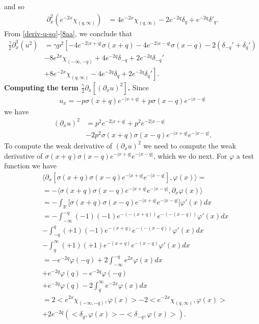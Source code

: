 \documentclass[12pt,reqno]{amsart}
\numberwithin{equation}{section}  %
\numberwithin{figure}{section}
\newcommand{\rr}{\mathbb{R}}
\newcommand{\p}{\partial}
\theoremstyle{plain}  %
\theoremstyle{definition}
\begin{document}
%
%
and so
%
%
\begin{equation}
  \label{6aa}
  \begin{split}
    \p_x^2 (e^{-2x} \chi_{(q, \infty)})
    & = 4e^{-2x} \chi_{(q, \infty)} - 2e^{-2q} \delta_{q} + e^{-2q}
    \delta'_{q}.
  \end{split}
\end{equation}
%
%
%
%
From \eqref{deriv-u-sq}-\eqref{8aa}, we conclude that
%
%
\begin{equation}
  \label{deriv-trip-u-sq}
  \begin{split}
    \frac{\gamma}{2}\p_x^3 (u^{2})
    & = \gamma p^{2}\left[ -4 e^{-2| x+q |} \sigma(x+q) - 4e^{-2| x-q
    |}\sigma(x-q) -2 (\delta_{-q}' + \delta_{q}') \right.
    \\
    & - 8e^{2x} \chi_{(-\infty, -q)} + 4e^{-2q} \delta_{-q} +
    2e^{-2q} \delta_{-q}'
    \\
    & \left. + 8e^{-2x}\chi_{(q, \infty)} -4 e^{-2q}
    \delta_{q} + 2e^{-2q} \delta_{q}' \right].
  \end{split}
\end{equation}
%
%
{\bf Computing the term $\displaystyle \frac{\gamma}{2}\p_x [(\p_x u)^2]$.}
Since 
%
\begin{align*}
  u_x = -p\sigma(x+q) e^{-|x+q|} + p\sigma(x-q)e^{-|x-q|}
\end{align*}
%
we have
%
\begin{align*}
  (\p_x u)^2
  &= 
  p^2 e^{-2|x+q|} + p^2e^{-2|x-q|} \\
  &-2p^2\sigma(x+q) \sigma(x-q) e^{-|x+q|} e^{-|x-q|}.
\end{align*}
%
To compute   the weak derivative of $(\p_x u)^2$ we need 
to compute the weak derivative of 
$\sigma(x+q) \sigma(x-q) e^{-|x+q|} e^{-|x-q|}$, which we do next.
For  $\varphi$ a test function we have
%
%
%
\begin{align*}
  &\langle
  \p_x[
  \sigma(x+q) \sigma(x-q) e^{-|x+q|} e^{-|x-q|}], \varphi(x)
  \rangle=
  \\
  &=
  -
  \langle
  \sigma(x+q) \sigma(x-q) e^{-|x+q|} e^{-|x-q|}, \p_x\varphi(x)
  \rangle
  \\
  &=
  -\int_\rr
  \Big[
  \sigma(x+q) \sigma(x-q) e^{-|x+q|} e^{-|x-q|} 
  \Big]
  \varphi'(x) dx \\
  &=
  - \int_{-\infty}^{-q}
  (-1)(-1) e^{-(-(x+q))} e^{-(-(x-q))} \varphi'(x) dx \\
  &-
  \int_{-q}^q
  (+1)(-1) e^{-(x+q)} e^{-(-(x-q))} \varphi'(x) dx \\
  &-
  \int_q^{\infty} (+1)(+1) e^{-(x+q)} e^{-(x-q)} \varphi'(x) dx \\
  &=
  - e^{-2q} \varphi(-q)
  +2 \int_{-\infty}^{-q} e^{2x} \varphi(x) dx  \\
  &
  +e^{-2q} \varphi(q) 
  -e^{-2q}  \varphi(-q) \\
  &+
  e^{-2q}\varphi(q) 
  -2 \int_q^{\infty} e^{-2x} \varphi(x) dx \\
  &=
  2 <
  e^{2x} \chi_{(-\infty, -q)}, \varphi(x)> 
  -2  < e^{-2x} \chi_{(q, \infty)}, \varphi(x)> \\
  &
  + 2 e^{-2q}\left( < \delta_q, \varphi(x)>
  - < \delta_{-q}, \varphi(x)>\right).
\end{align*}
\end{document}
